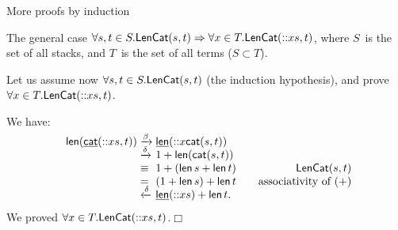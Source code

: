 %
\begin{frame}{More proofs by induction}

  The general case \(\forall s,t \in S.\textsf{LenCat}({s,t}) \Rightarrow
  \forall x \in T.\textsf{LenCat}({\textsf{::}{x}{s}, t})\), where \(S\)~is the
  set of all stacks, and \(T\)~is the set of all terms (\(S \subset
  T\)).

  \bigskip

  Let us assume now \(\forall s,t \in S.\textsf{LenCat}({s,t})\) (the
  induction hypothesis), and prove \(\forall x \in
  T.\textsf{LenCat}({\textsf{::}{x}{s}, t})\).

  \bigskip

  We have:
  \begin{equation*}
    \begin{array}{r@{\;}l@{\;}l@{\qquad}r@{}}
        \fun{len}(\ufun{cat}(\cons{x}{s},t))
      & \smashedrightarrow{\beta}
      & \ufun{len}(\cons{x}{\fun{cat}(s,t)})\\
      & \smashedrightarrow{\delta}
      & 1 + \fun{len}(\fun{cat}(s,t))\\
      & \equiv & 1 + (\fun{len}\,s + \fun{len}\,t)
      & \pred{LenCat}{s,t}\\
      & = & (1 + \fun{len}\,s) + \fun{len}\,t
      & \text{associativity of \((+)\)}\\
      & \smashedleftarrow{\delta}
      & \ufun{len}(\cons{x}{s}) + \fun{len}\,t.
    \end{array}
  \end{equation*}
  We proved \(\forall x \in T.\textsf{LenCat}({\textsf{::}{x}{s}, t})\).\hfill\(\Box\)

\end{frame}
